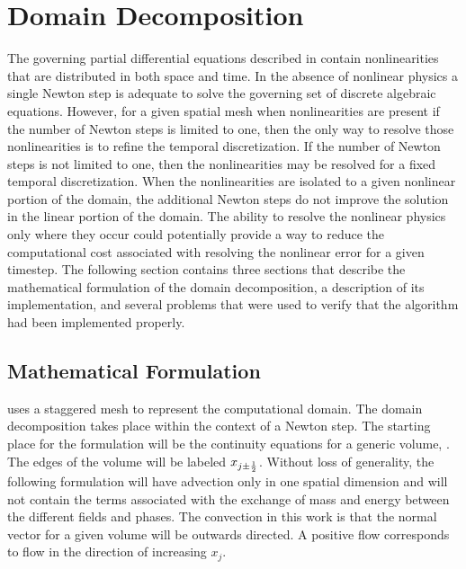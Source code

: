 \chapter{Domain Decomposition}
\label{chap:domain_decomposition}
The governing partial differential equations described in  contain nonlinearities that are distributed in both space and time.
In the absence of nonlinear physics a single Newton step is adequate to solve the governing set of discrete algebraic equations.
However, for a given spatial mesh when nonlinearities are present if the number of Newton steps is limited to one, then the only way to resolve those nonlinearities is to refine the temporal discretization.
If the number of Newton steps is not limited to one, then the nonlinearities may be resolved for a fixed temporal discretization.
When the nonlinearities are isolated to a given nonlinear portion of the domain, the additional Newton steps do not improve the solution in the linear portion of the domain.
The ability to resolve the nonlinear physics only where they occur could potentially provide a way to reduce the computational cost associated with resolving the nonlinear error for a given timestep.
The following section contains three sections that describe the mathematical formulation of the domain decomposition, a description of its implementation, and several problems that were used to verify that the algorithm had been implemented properly.

\section{Mathematical Formulation}
\label{sec:dd_math}

\cobra{} uses a staggered mesh to represent the computational domain.
The domain decomposition takes place within the context of a Newton step.
The starting place for the formulation will be the continuity equations for a generic volume,  .
The edges of the volume will be labeled $x_{j \pm \onehalf}$.
Without loss of generality, the following formulation will have advection only in one spatial dimension and will not contain the terms associated with the exchange of mass and energy between the different fields and phases.
The convection in this work is that the normal vector for a given volume will be outwards directed.
A positive flow corresponds to flow in the direction of increasing $x_{j}$.  

